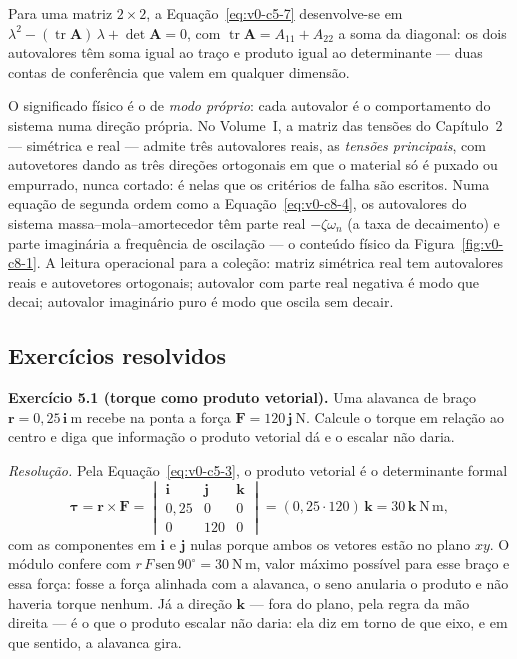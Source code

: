 \documentclass[12pt,a4paper]{article}
\numberwithin{equation}{section}
\numberwithin{table}{section}
\numberwithin{figure}{section}
\begin{document}
Para uma matriz $2\times 2$, a Equação~\eqref{eq:v0-c5-7} desenvolve-se em
$\lambda^2 - (\operatorname{tr}\bm{A})\,\lambda + \det\bm{A} = 0$, com
$\operatorname{tr}\bm{A} = A_{11} + A_{22}$ a soma da diagonal: os dois
autovalores têm soma igual ao traço e produto igual ao determinante ---
duas contas de conferência que valem em qualquer dimensão.

O significado físico é o de \emph{modo próprio}: cada autovalor é o
comportamento do sistema numa direção própria. No Volume~I, a matriz das
tensões do Capítulo~2 --- simétrica e real --- admite três autovalores
reais, as \emph{tensões principais}, com autovetores dando as três
direções ortogonais em que o material só é puxado ou empurrado, nunca
cortado: é nelas que os critérios de falha são escritos. Numa equação de
segunda ordem como a Equação~\eqref{eq:v0-c8-4}, os autovalores do sistema
massa--mola--amortecedor têm parte real $-\zeta\omega_n$ (a taxa de
decaimento) e parte imaginária a frequência de oscilação --- o conteúdo
físico da Figura~\ref{fig:v0-c8-1}. A leitura operacional para a coleção:
matriz simétrica real tem autovalores reais e autovetores ortogonais;
autovalor com parte real negativa é modo que decai; autovalor imaginário
puro é modo que oscila sem decair.

\subsection{Exercícios resolvidos}

\textbf{Exercício 5.1 (torque como produto vetorial).} Uma alavanca de
braço $\bm{r} = 0{,}25\,\bm{i}\ \mathrm{m}$ recebe na ponta a força
$\bm{F} = 120\,\bm{j}\ \mathrm{N}$. Calcule o torque em relação ao centro
e diga que informação o produto vetorial dá e o escalar não daria.

\emph{Resolução.} Pela Equação~\eqref{eq:v0-c5-3}, o produto vetorial é o
determinante formal
$$\bm{\tau} = \bm{r}\times\bm{F} =
\begin{vmatrix}
\bm{i} & \bm{j} & \bm{k}\\
0{,}25 & 0 & 0\\
0 & 120 & 0
\end{vmatrix}
= (0{,}25\cdot 120)\,\bm{k} = 30\,\bm{k}\ \mathrm{N\,m},$$
com as componentes em $\bm{i}$ e $\bm{j}$ nulas porque ambos os vetores
estão no plano $xy$. O módulo confere com
$r\,F\,\mathrm{sen}\,90^\circ = 30\ \mathrm{N\,m}$, valor máximo possível
para esse braço e essa força: fosse a força alinhada com a alavanca, o
seno anularia o produto e não haveria torque nenhum. Já a direção
$\bm{k}$ --- fora do plano, pela regra da mão direita --- é o que o
produto escalar não daria: ela diz em torno de que eixo, e em que
sentido, a alavanca gira.
\end{document}
